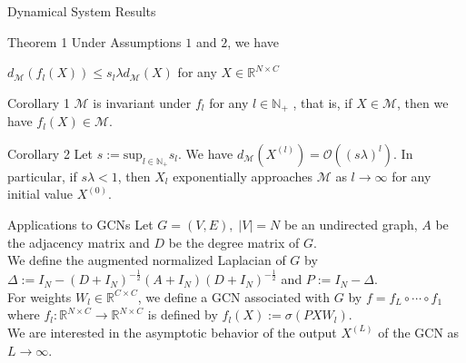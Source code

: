 \documentclass{beamer}
\theoremstyle{definition}
\begin{document}
\begin{frame}{Dynamical System Results}
    \begin{block}{Theorem 1}
        Under Assumptions \(1\) and \(2\), we have 
        \begin{center}
            \(d_{\mathcal{M}}(f_{l}(X)) \leq s_{l}\lambda d_{\mathcal{M}}(X)\) for any \(X\in \mathbb{R}^{N\times C}\)  
        \end{center}
    \end{block}
    \begin{block}{Corollary 1}
        \(\mathcal{M}\) is invariant under \(f_{l}\) for any \(l\in\mathbb{N}_{+}\) , that is, if \(X\in\mathcal{M}\), then we have \(f_{l}(X)\in\mathcal{M}\).
    \end{block}
    \begin{block}{Corollary 2}
        Let \(s := \text{sup}_{l\in\mathbb{N}_{+}} s_{l}\). We have \(d_{\mathcal{M}}(X^{(l)}) = \mathcal{O}((s\lambda)^l)\). In particular, if \(s\lambda<1\), then \(X_{l}\) exponentially approaches \(\mathcal{M}\) as \(l\rightarrow\infty\) for any initial value \(X^{(0)}\).
    \end{block}
\end{frame}


\begin{frame}{Applications to GCNs}
    Let \(G=(V,E),\;|V|=N\) be an undirected graph, \(A\) be the adjacency matrix and \(D\) be the degree matrix of \(G\).\\
    \bigskip
    We define the augmented normalized Laplacian of \(G\) by \(\Delta:=I_{N}-(D+I_{N})^{-\frac{1}{2}}(A+I_{N})(D+I_{N})^{-\frac{1}{2}}\) and \(P:=I_{N}-\Delta\).\\
    \bigskip \pause
    For weights \(W_{l}\in \mathbb{R}^{C\times C}\), we define a GCN associated with \(G\) by \(f = f_{L}\circ\cdots\circ f_{1}\) where \(f_{l}:\mathbb{R}^{N\times C}\rightarrow\mathbb{R}^{N\times C}\) is defined by \(f_{l}(X) := \sigma(PXW_{l})\). \\
    \bigskip
    We are interested in the asymptotic behavior of the output \(X^{(L)}\) of the GCN as \(L \rightarrow\infty\).
    
\end{frame}
\end{document}
